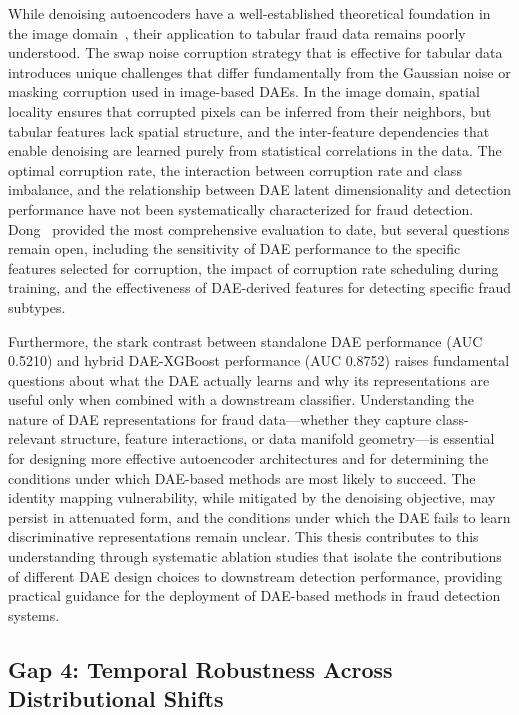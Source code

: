 While denoising autoencoders have a well-established theoretical foundation in
the image domain~\cite{vincent2010stacked}, their application to tabular fraud
data remains poorly understood. The swap noise corruption strategy that is
effective for tabular data introduces unique challenges that differ
fundamentally from the Gaussian noise or masking corruption used in image-based
DAEs. In the image domain, spatial locality ensures that corrupted pixels can be
inferred from their neighbors, but tabular features lack spatial structure, and
the inter-feature dependencies that enable denoising are learned purely from
statistical correlations in the data. The optimal corruption rate, the
interaction between corruption rate and class imbalance, and the relationship
between DAE latent dimensionality and detection performance have not been
systematically characterized for fraud detection. Dong~\cite{dong2025enhanced}
provided the most comprehensive evaluation to date, but several questions remain
open, including the sensitivity of DAE performance to the specific features
selected for corruption, the impact of corruption rate scheduling during
training, and the effectiveness of DAE-derived features for detecting specific
fraud subtypes.

Furthermore, the stark contrast between standalone DAE performance (AUC 0.5210)
and hybrid DAE-XGBoost performance (AUC 0.8752) raises fundamental questions
about what the DAE actually learns and why its representations are useful only
when combined with a downstream classifier. Understanding the nature of DAE
representations for fraud data---whether they capture class-relevant structure,
feature interactions, or data manifold geometry---is essential for designing
more effective autoencoder architectures and for determining the conditions
under which DAE-based methods are most likely to succeed. The identity mapping
vulnerability, while mitigated by the denoising objective, may persist in
attenuated form, and the conditions under which the DAE fails to learn
discriminative representations remain unclear. This thesis contributes to this
understanding through systematic ablation studies that isolate the contributions
of different DAE design choices to downstream detection performance, providing
practical guidance for the deployment of DAE-based methods in fraud detection
systems.

\subsection{Gap 4: Temporal Robustness Across Distributional Shifts}

